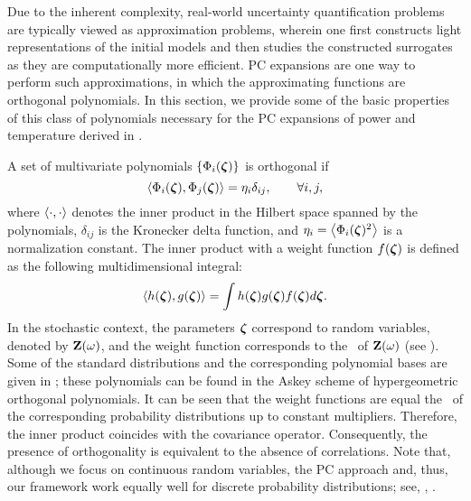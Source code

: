 Due to the inherent complexity, real-world uncertainty quantification problems are typically viewed as approximation problems, wherein one first constructs light representations of the initial models and then studies the constructed surrogates as they are computationally more efficient.
PC expansions \cite{xiu2010} are one way to perform such approximations, in which the approximating functions are orthogonal polynomials.
In this section, we provide some of the basic properties \cite{xiu2010, maitre2010} of this class of polynomials necessary for the PC expansions of power and temperature derived in .

A set of multivariate polynomials $\{ \Phi_i(\boldsymbol{\zeta}) \}$ is orthogonal if
\begin{equation} \elabel{orthogonality}
  \oInner{\pcb_i(\vz)}{\pcb_j(\vz)} = \pcn_i \delta_{ij}, \qquad \forall i, j,
\end{equation}
where $\oInner{\idot}{\idot}$ denotes the inner product in the Hilbert space spanned by the polynomials, $\delta_{ij}$ is the Kronecker delta function, and $\pcn_i = \oInner{\pcb_i(\vz)^2}$ is a normalization constant.
The inner product with a weight function $f(\boldsymbol{\zeta})$ is defined as the following multidimensional integral:
\begin{equation} \elabel{inner-product}
  \oInner{h(\vz)}{g(\vz)} = \int h(\vz) g(\vz) \PDF(\vz) d\vz.
\end{equation}
In the stochastic context, the parameters $\boldsymbol{\zeta}$ correspond to random variables, denoted by $\mathbf{Z}(\omega)$, and the weight function corresponds to the \pdf\ of $\mathbf{Z}(\omega)$ (see ).
Some of the standard distributions and the corresponding polynomial bases are given in  \cite{eldred2008}; these polynomials can be found in the Askey scheme \cite{xiu2010} of hypergeometric orthogonal polynomials.
It can be seen that the weight functions are equal the \pdfs\ of the corresponding probability distributions up to constant multipliers.
Therefore, the inner product coincides with the covariance operator.
Consequently, the presence of orthogonality is equivalent to the absence of correlations.
Note that, although we focus on continuous random variables, the PC approach and, thus, our framework work equally well for discrete probability distributions; see, \eg, \cite{xiu2010, maitre2010}.

